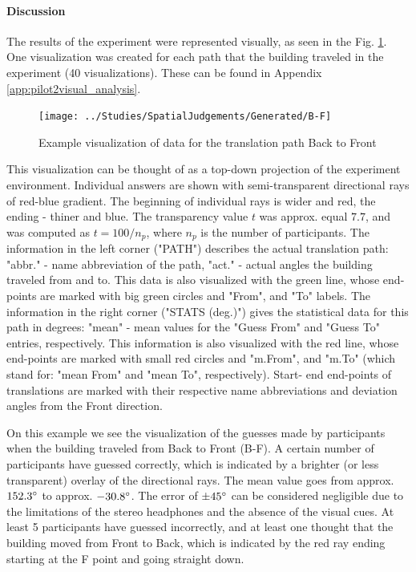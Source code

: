 \paragraph{Discussion}
The results of the experiment were represented visually, as seen in the Fig. \ref{fig:b-f}. One visualization was created for each path that the building traveled in the experiment (40 visualizations). These can be found in Appendix \ref{app:pilot2visual_analysis}.

\begin{figure}
	\centering
	\texttt{[image: ../Studies/SpatialJudgements/Generated/B-F]}
	\caption{Example visualization of data for the translation path Back to Front}
	\label{fig:b-f}
\end{figure}

This visualization can be thought of as a top-down projection of the experiment environment.
Individual answers are shown with semi-transparent directional rays of red-blue gradient. The beginning of individual rays is wider and red, the ending - thiner and blue. The transparency value $t$ was approx. equal $7.7$, and was computed as $t = 100 / n_{p}$, where $ n_{p} $ is the number of participants.
The information in the left corner ("PATH") describes the actual translation path: "abbr." - name abbreviation of the path, "act." - actual angles the building traveled from and to. This data is also visualized with the green line, whose end-points are marked with big green circles and "From", and "To" labels.
The information in the right corner ("STATS (deg.)") gives the statistical data for this path in degrees: "mean" - mean values for the "Guess From" and "Guess To" entries, respectively. This information is also visualized with the red line, whose end-points are marked with small red circles and "m.From", and "m.To" (which stand for: "mean From" and "mean To", respectively).
Start- end end-points of translations are marked with their respective name abbreviations and deviation angles from the Front direction.

On this example we see the visualization of the guesses made by participants when the building traveled from Back to Front (B-F). A certain number of participants have guessed correctly, which is indicated by a brighter (or less transparent) overlay of the directional rays. The mean value goes from approx. $152.3\degree$ to approx. $- 30.8\degree$. The error of $\pm 45\degree$ can be considered negligible due to the limitations of the stereo headphones and the absence of the visual cues. At least 5 participants have guessed incorrectly, and at least one thought that the building moved from Front to Back, which is indicated by the red ray ending starting at the F point and going straight down.


